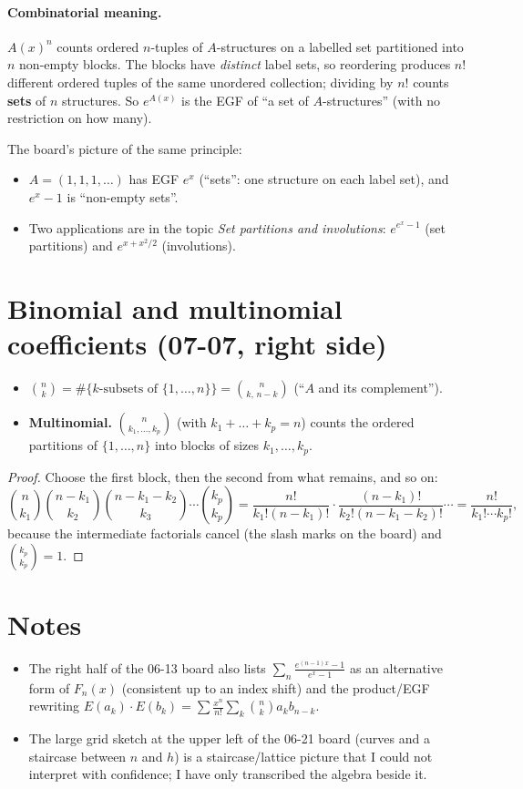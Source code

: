 \documentclass[11pt]{article}
\begin{document}
\paragraph{Combinatorial meaning.} $A(x)^n$ counts ordered $n$-tuples of $A$-structures on a labelled set partitioned into $n$ non-empty blocks. The blocks have \emph{distinct} label sets, so reordering produces $n!$ different ordered tuples of the same unordered collection; dividing by $n!$ counts \textbf{sets} of $n$ structures. So $e^{A(x)}$ is the EGF of ``a set of $A$-structures'' (with no restriction on how many).

The board's picture of the same principle:
\begin{itemize}[nosep]
  \item $A=(1,1,1,\dots)$ has EGF $e^x$ (``sets'': one structure on each label set), and $e^x-1$ is ``non-empty sets''.
  \item Two applications are in the topic \emph{Set partitions and involutions}: $e^{e^x-1}$ (set partitions) and $e^{x+x^2/2}$ (involutions).
\end{itemize}

\section{Binomial and multinomial coefficients (07-07, right side)}

\begin{itemize}[nosep]
  \item $\binom nk=\#\{k\text{-subsets of }\{1,\dots,n\}\}=\binom n{k,\,n-k}$ (``$A$ and its complement'').
  \item \textbf{Multinomial.} $\binom n{k_1,\dots,k_p}$ (with $k_1+\dots+k_p=n$) counts the ordered partitions of $\{1,\dots,n\}$ into blocks of sizes $k_1,\dots,k_p$.
\end{itemize}
\begin{proof}
Choose the first block, then the second from what remains, and so on:
\[
\binom n{k_1}\binom{n-k_1}{k_2}\binom{n-k_1-k_2}{k_3}\cdots\binom{k_p}{k_p}
=\frac{n!}{k_1!(n-k_1)!}\cdot\frac{(n-k_1)!}{k_2!(n-k_1-k_2)!}\cdots=\frac{n!}{k_1!\cdots k_p!},
\]
because the intermediate factorials cancel (the slash marks on the board) and $\binom{k_p}{k_p}=1$.
\end{proof}

\section*{Notes}
\begin{itemize}[nosep]
  \item The right half of the 06-13 board also lists $\sum_n\frac{e^{(n-1)x}-1}{e^x-1}$ as an alternative form of $F_n(x)$ (consistent up to an index shift) and the product/EGF rewriting $E(a_k)\cdot E(b_k)=\sum\frac{x^n}{n!}\sum_k\binom nka_kb_{n-k}$.
  \item The large grid sketch at the upper left of the 06-21 board (curves and a staircase between $n$ and $h$) is a staircase/lattice picture that I could not interpret with confidence; I have only transcribed the algebra beside it.
\end{itemize}
\end{document}

